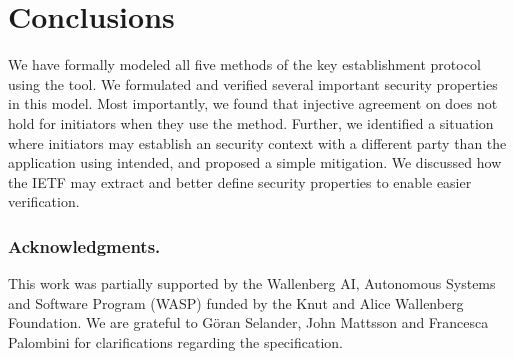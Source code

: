 \documentclass[runningheads, envcountsame, a4paper, draft, x11names]{llncs}
\begin{document}
\section{Conclusions}
\label{sec:conclusions}
We have formally modeled all five
methods of the \mEdhoc{} key establishment protocol using the \mTamarin{} tool.
%
We formulated and verified several important security properties in this model.
%
%
Most importantly, we found that injective agreement on \mGiy{} does not hold for
initiators when they use the \mStat{} method.
%
Further, we identified a situation where initiators may establish an \mOscore{}
security context with a different party than the application using \mEdhoc{}
intended, and proposed a simple mitigation.
%
We discussed how the IETF may extract and better define security properties to
enable easier verification.
%

\subsubsection*{Acknowledgments.} This work was partially supported by
the Wallenberg AI, Autonomous Systems and Software Program (WASP) funded by
the Knut and Alice Wallenberg Foundation.
%
We are grateful to G\"oran Selander, John Mattsson and Francesca Palombini for
clarifications regarding the specification.
%




\end{document}
